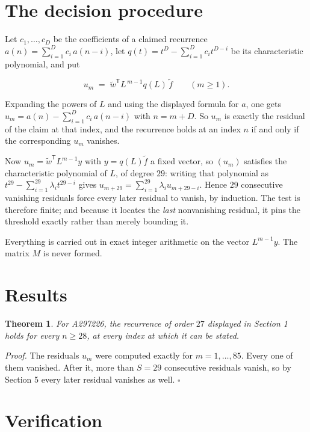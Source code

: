 \documentclass[11pt]{article}
\newtheorem{theorem}{Theorem}
\theoremstyle{definition}
\begin{document}
\section{The decision procedure}

Let $c_1,\dots,c_D$ be the coefficients of a claimed recurrence $a(n) = \sum_{i=1}^{D} c_i\,a(n-i)$, let $q(t) = t^{D} - \sum_{i=1}^{D} c_i t^{D-i}$ be its characteristic polynomial, and put

\[u_m \;=\; \tilde w^{\mathsf T} L^{\,m-1} q(L)\,\tilde f \qquad (m \ge 1).\]

Expanding the powers of $L$ and using the displayed formula for $a$, one gets $u_m = a(n) - \sum_{i=1}^{D} c_i\,a(n-i)$ with $n = m + D$. So $u_m$ is exactly the residual of the claim at that index, and the recurrence holds at an index $n$ if and only if the corresponding $u_m$ vanishes.

Now $u_m = \tilde w^{\mathsf T} L^{m-1} y$ with $y = q(L)\tilde f$ a fixed vector, so $(u_m)$ satisfies the characteristic polynomial of $L$, of degree $29$: writing that polynomial as $t^{29} - \sum_{i=1}^{29} \lambda_i t^{29-i}$ gives $u_{m+29} = \sum_{i=1}^{29} \lambda_i u_{m+29-i}$. Hence $29$ consecutive vanishing residuals force every later residual to vanish, by induction. The test is therefore finite; and because it locates the {\itshape last} nonvanishing residual, it pins the threshold exactly rather than merely bounding it.

Everything is carried out in exact integer arithmetic on the vector $L^{m-1}y$. The matrix $M$ is never formed.

\section{Results}

\begin{theorem} For A297226, the recurrence of order $27$ displayed in Section 1 holds for every $n \ge 28$, at every index at which it can be stated.\end{theorem}

{\itshape Proof.} The residuals $u_m$ were computed exactly for $m = 1,\dots,85$. Every one of them vanished. After it, more than $S = 29$ consecutive residuals vanish, so by Section 5 every later residual vanishes as well. $\square$

\section{Verification}
\end{document}
